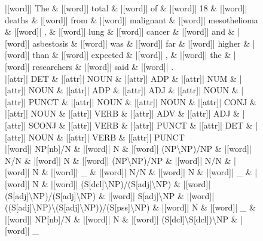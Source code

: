 \documentclass[10pt,a4paper]{article}
\begin{document}
\begin{figure}[h]
{\begin{dependency}[theme = simple]
\begin{deptext}[column sep=1em, row sep=0.1em]
|[word]| The \& |[word]| total \& |[word]| of \& |[word]| 18 \& |[word]| deaths \& |[word]| from \& |[word]| malignant \& |[word]| mesothelioma \& |[word]| , \& |[word]| lung \& |[word]| cancer \& |[word]| and \& |[word]| asbestosis \& |[word]| was \& |[word]| far \& |[word]| higher \& |[word]| than \& |[word]| expected \& |[word]| , \& |[word]| the \& |[word]| researchers \& |[word]| said \& |[word]| . \\
|[attr]| DET \& |[attr]| NOUN \& |[attr]| ADP \& |[attr]| NUM \& |[attr]| NOUN \& |[attr]| ADP \& |[attr]| ADJ \& |[attr]| NOUN \& |[attr]| PUNCT \& |[attr]| NOUN \& |[attr]| NOUN \& |[attr]| CONJ \& |[attr]| NOUN \& |[attr]| VERB \& |[attr]| ADV \& |[attr]| ADJ \& |[attr]| SCONJ \& |[attr]| VERB \& |[attr]| PUNCT \& |[attr]| DET \& |[attr]| NOUN \& |[attr]| VERB \& |[attr]| PUNCT \\
|[word]| NP{[}nb{]}/N \& |[word]| N \& |[word]| (NP\textbackslash{}NP)/NP \& |[word]| N/N \& |[word]| N \& |[word]| (NP\textbackslash{}NP)/NP \& |[word]| N/N \& |[word]| N \& |[word]| \_ \& |[word]| N/N \& |[word]| N \& |[word]| \_ \& |[word]| N \& |[word]| (S{[}dcl{]}\textbackslash{}NP)/(S{[}adj{]}\textbackslash{}NP) \& |[word]| (S{[}adj{]}\textbackslash{}NP)/(S{[}adj{]}\textbackslash{}NP) \& |[word]| S{[}adj{]}\textbackslash{}NP \& |[word]| ((S{[}adj{]}\textbackslash{}NP)\textbackslash{}(S{[}adj{]}\textbackslash{}NP))/(S{[}pss{]}\textbackslash{}NP) \& |[word]| N \& |[word]| \_ \& |[word]| NP{[}nb{]}/N \& |[word]| N \& |[word]| (S{[}dcl{]}\textbackslash{}S{[}dcl{]})\textbackslash{}NP \& |[word]| \_ \\
\end{deptext}




\end{dependency}}
\end{figure}
\end{document}
